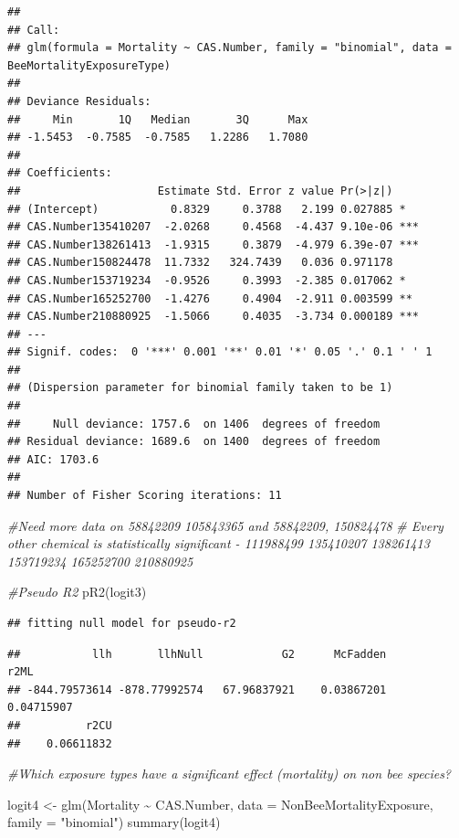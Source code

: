 \documentclass[
  12pt,
]{article}
\newenvironment{Shaded}{\begin{snugshade}}{\end{snugshade}}
\newcommand{\AttributeTok}[1]{\textcolor[rgb]{0.77,0.63,0.00}{#1}}
\newcommand{\CommentTok}[1]{\textcolor[rgb]{0.56,0.35,0.01}{\textit{#1}}}
\newcommand{\FunctionTok}[1]{\textcolor[rgb]{0.00,0.00,0.00}{#1}}
\newcommand{\NormalTok}[1]{#1}
\newcommand{\OtherTok}[1]{\textcolor[rgb]{0.56,0.35,0.01}{#1}}
\newcommand{\SpecialCharTok}[1]{\textcolor[rgb]{0.00,0.00,0.00}{#1}}
\newcommand{\StringTok}[1]{\textcolor[rgb]{0.31,0.60,0.02}{#1}}
\begin{document}
\begin{verbatim}
## 
## Call:
## glm(formula = Mortality ~ CAS.Number, family = "binomial", data = BeeMortalityExposureType)
## 
## Deviance Residuals: 
##     Min       1Q   Median       3Q      Max  
## -1.5453  -0.7585  -0.7585   1.2286   1.7080  
## 
## Coefficients:
##                     Estimate Std. Error z value Pr(>|z|)    
## (Intercept)           0.8329     0.3788   2.199 0.027885 *  
## CAS.Number135410207  -2.0268     0.4568  -4.437 9.10e-06 ***
## CAS.Number138261413  -1.9315     0.3879  -4.979 6.39e-07 ***
## CAS.Number150824478  11.7332   324.7439   0.036 0.971178    
## CAS.Number153719234  -0.9526     0.3993  -2.385 0.017062 *  
## CAS.Number165252700  -1.4276     0.4904  -2.911 0.003599 ** 
## CAS.Number210880925  -1.5066     0.4035  -3.734 0.000189 ***
## ---
## Signif. codes:  0 '***' 0.001 '**' 0.01 '*' 0.05 '.' 0.1 ' ' 1
## 
## (Dispersion parameter for binomial family taken to be 1)
## 
##     Null deviance: 1757.6  on 1406  degrees of freedom
## Residual deviance: 1689.6  on 1400  degrees of freedom
## AIC: 1703.6
## 
## Number of Fisher Scoring iterations: 11
\end{verbatim}

\begin{Shaded}
\begin{Highlighting}[]
 \CommentTok{\#Need more data on 58842209 105843365 and 58842209, 150824478}
 \CommentTok{\# Every other chemical is statistically significant {-} 111988499 135410207 138261413  153719234 165252700 210880925 }

\CommentTok{\#Pseudo R2}
 \FunctionTok{pR2}\NormalTok{(logit3)}
\end{Highlighting}
\end{Shaded}

\begin{verbatim}
## fitting null model for pseudo-r2
\end{verbatim}

\begin{verbatim}
##           llh       llhNull            G2      McFadden          r2ML 
## -844.79573614 -878.77992574   67.96837921    0.03867201    0.04715907 
##          r2CU 
##    0.06611832
\end{verbatim}

\begin{Shaded}
\begin{Highlighting}[]
\CommentTok{\#Which exposure types have a significant effect (mortality) on non bee species?}

\NormalTok{logit4 }\OtherTok{\textless{}{-}} \FunctionTok{glm}\NormalTok{(Mortality }\SpecialCharTok{\textasciitilde{}}\NormalTok{ CAS.Number, }\AttributeTok{data =}\NormalTok{ NonBeeMortalityExposure, }\AttributeTok{family =} \StringTok{"binomial"}\NormalTok{)}
\FunctionTok{summary}\NormalTok{(logit4)}
\end{Highlighting}
\end{Shaded}
\end{document}
